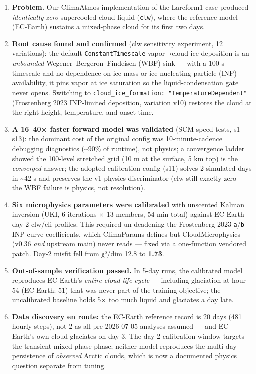 \documentclass[11pt]{article}
\providecommand{\tightlist}{%
      \setlength{\itemsep}{0pt}\setlength{\parskip}{0pt}}
\begin{document}
\begin{enumerate}
\def\labelenumi{\arabic{enumi}.}
\tightlist
\item
  \textbf{Problem.} Our ClimaAtmos implementation of the Larcform1 case
  produced \emph{identically zero} supercooled cloud liquid
  (\texttt{clw}), where the reference model (EC-Earth) sustains a
  mixed-phase cloud for its first two days.
\item
  \textbf{Root cause found and confirmed} (clw sensitivity experiment,
  12 variations): the default \texttt{ConstantTimescale} vapor→cloud-ice
  deposition is an \emph{unbounded} Wegener--Bergeron--Findeisen (WBF)
  sink --- with a 100 s timescale and no dependence on ice mass or
  ice-nucleating-particle (INP) availability, it pins vapor at ice
  saturation so the liquid-condensation gate never opens. Switching to
  \texttt{cloud\_ice\_formation:\ "TemperatureDependent"} (Frostenberg
  2023 INP-limited deposition, variation v10) restores the cloud at the
  right height, temperature, and onset time.
\item
  \textbf{A 16--40× faster forward model was validated} (SCM speed
  tests, s1--s13): the dominant cost of the original config was
  10-minute-cadence debugging diagnostics (\textasciitilde90\% of
  runtime), not physics; a convergence ladder showed the 100-level
  stretched grid (10 m at the surface, 5 km top) is the \emph{converged}
  answer; the adopted calibration config (s11) solves 2 simulated days
  in \textasciitilde42 s and preserves the v1-physics discriminator (clw
  still exactly zero --- the WBF failure is physics, not resolution).
\item
  \textbf{Six microphysics parameters were calibrated} with unscented
  Kalman inversion (UKI, 6 iterations × 13 members, 54 min total)
  against EC-Earth day-2 clw/cli profiles. This required un-deadening
  the Frostenberg 2023 \texttt{a}/\texttt{b} INP-curve coefficients,
  which ClimaParams defines but CloudMicrophysics (v0.36 \emph{and}
  upstream main) never reads --- fixed via a one-function vendored
  patch. Day-2 misfit fell from χ²/dim 12.8 to \textbf{1.73}.
\item
  \textbf{Out-of-sample verification passed.} In 5-day runs, the
  calibrated model reproduces EC-Earth's \emph{entire cloud life cycle}
  --- including glaciation at hour 54 (EC-Earth: 51) that was never part
  of the training objective; the uncalibrated baseline holds 5× too much
  liquid and glaciates a day late.
\item
  \textbf{Data discovery en route:} the EC-Earth reference record is 20
  days (481 hourly steps), not 2 as all pre-2026-07-05 analyses assumed
  --- and EC-Earth's own cloud glaciates on day 3. The day-2 calibration
  window targets the transient mixed-phase phase; neither model
  reproduces the multi-day persistence of \emph{observed} Arctic clouds,
  which is now a documented physics question separate from tuning.
\end{enumerate}
\end{document}
